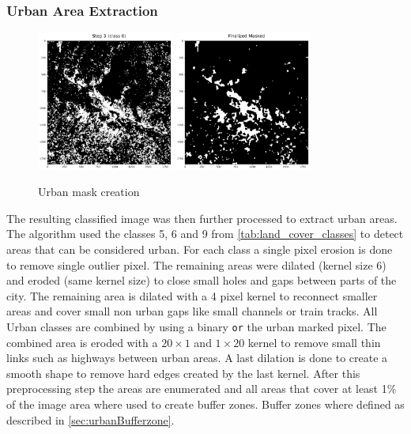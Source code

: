 \documentclass[12pt,a4paper, english,twoside]{article}
\begin{document}
    \subsubsection{Urban Area Extraction}
      \begin{figure}
      \vspace{-2cm}
       \begin{center}
         \includegraphics[width=0.4\textwidth]{img/Step3.png}
       \label{fig:msksub}
         \includegraphics[width=0.4\textwidth]{img/FinalizedMask.png}
       \label{fig:msksub}
       \end{center}
       \caption{Urban mask creation}\label{fig:mask}
      \end{figure}
 
      The resulting classified image was then further processed to extract urban areas.
      The algorithm used the classes 5, 6 and 9 from \cref{tab:land_cover_classes} to detect areas that can be considered urban.
      For each class a single pixel erosion is done to remove single outlier pixel.
      The remaining areas were \gls{dilated} (kernel size 6) and \gls{eroded} (same kernel size) to close small holes and gaps between parts of the city.
      The remaining area is dilated with a 4 pixel kernel to reconnect smaller areas and cover small non urban gaps like small channels or train tracks.
      All Urban classes are combined by using a binary \texttt{or} the urban marked pixel.
      The combined area is eroded with a $20\times1$ and $1\times20$ kernel to remove small thin links such as highways between urban areas. 
      A last dilation is done to create a smooth shape to remove hard edges created by the last kernel.
      After this preprocessing step the areas are enumerated and all areas that cover at least 1\% of the image area where used to create buffer zones. 
      Buffer zones where defined as described in \cref{sec:urbanBufferzone}.\\
\end{document}
